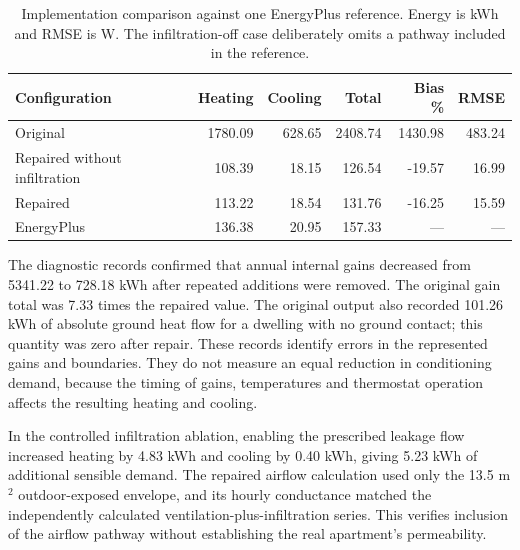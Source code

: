 \begin{table}[htbp]\centering\small

\caption{Implementation comparison against one EnergyPlus reference. Energy is kWh and RMSE is W. The infiltration-off case deliberately omits a pathway included in the reference.}

\begin{tabularx}{\textwidth}{@{}Xrrrrr@{}}

\toprule

Configuration & Heating & Cooling & Total & Bias \% & RMSE \\

\midrule

Original & 1780.09 & 628.65 & 2408.74 & 1430.98 & 483.24 \\

Repaired without infiltration & 108.39 & 18.15 & 126.54 & -19.57 & 16.99 \\

Repaired & 113.22 & 18.54 & 131.76 & -16.25 & 15.59 \\

EnergyPlus & 136.38 & 20.95 & 157.33 & --- & --- \\

\bottomrule

\end{tabularx}

\end{table}

The diagnostic records confirmed that annual internal gains decreased from 5341.22 to 728.18 kWh after repeated additions were removed. The original gain total was 7.33 times the repaired value. The original output also recorded 101.26 kWh of absolute ground heat flow for a dwelling with no ground contact; this quantity was zero after repair. These records identify errors in the represented gains and boundaries. They do not measure an equal reduction in conditioning demand, because the timing of gains, temperatures and thermostat operation affects the resulting heating and cooling.

In the controlled infiltration ablation, enabling the prescribed leakage flow increased heating by 4.83 kWh and cooling by 0.40 kWh, giving 5.23 kWh of additional sensible demand. The repaired airflow calculation used only the 13.5 m$^2$ outdoor-exposed envelope, and its hourly conductance matched the independently calculated ventilation-plus-infiltration series. This verifies inclusion of the airflow pathway without establishing the real apartment's permeability.


